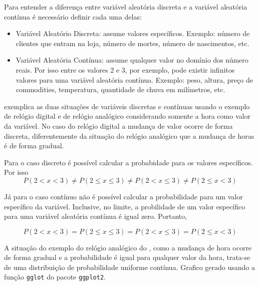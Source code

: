 \documentclass[
]{book}
\begin{document}
Para entender a diferença entre variável aleatória discreta e a variável aleatória contínua é necessário definir cada uma delas:

\begin{itemize}
\item
  Variável Aleatório Discreta: assume valores específicos. Exemplo: número de clientes que entram na loja, número de mortes, número de nascimentos, etc.
\item
  Variável Aleatória Contínua: assume qualquer valor no domínio dos número reais. Por isso entre os valores 2 e 3, por exemplo, pode existir infinitos valores para uma variável aleatória contínua. Exemplo: peso, altura, preço de commodities, temperatura, quantidade de chuva em milímetros, etc.
\end{itemize}

\citet{Sartoris2013} exemplica as duas situações de variáveis discretas e contínuas usando o exemplo de relógio digital e de relógio analógico considerando somente a hora como valor da variável. No caso do relógio digital a mudança de valor ocorre de forma discreta, diferentemente da situação do relógio analógico que a mudança de horas é de forma gradual.

Para o caso discreto é possível calcular a probabidade para os valores específicos. Por isso
\[
P(2<x<3) \neq P(2\leq x \leq 3) \neq P(2 < x \leq 3) \neq P(2\leq x < 3)
\]

Já para o caso contínuo não é possível calcular a probabilidade para um valor específico da variável. Inclusive, no limite, a probilidade de um valor específico para uma variável aleatória contínua é igual zero. Portanto,

\[
P(2<x<3) = P(2\leq x \leq 3) = P(2 < x \leq 3) = P(2\leq x < 3)
\]

A situação do exemplo do relógio analógico do \citet{Sartoris2013}, como a mudança de hora ocorre de forma gradual e a probabilidade é igual para qualquer valor da hora, trata-se de uma distribuição de probabilidade uniforme contínua. Grafico gerado usando a função \texttt{gglot} do pacote \texttt{ggplot2}.
\end{document}
